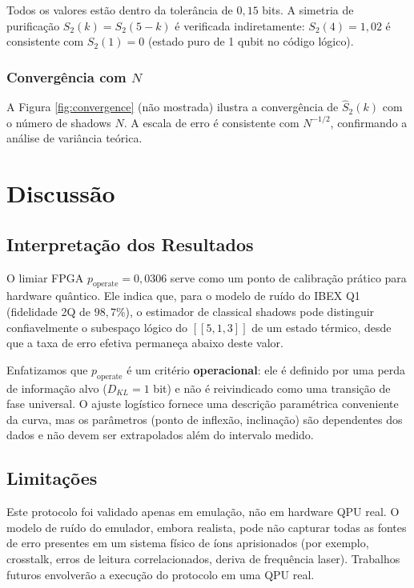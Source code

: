 \documentclass[12pt,a4paper,oneside]{book}
\theoremstyle{definition}
\theoremstyle{remark}
\begin{document}
Todos os valores estão dentro da tolerância de $0{,}15$ bits. A simetria de purificação $S_2(k) = S_2(5-k)$ é verificada indiretamente: $S_2(4) = 1{,}02$ é consistente com $S_2(1) = 0$ (estado puro de 1 qubit no código lógico).

\subsection{Convergência com $N$}

A Figura \ref{fig:convergence} (não mostrada) ilustra a convergência de $\widehat{S}_2(k)$ com o número de shadows $N$. A escala de erro é consistente com $N^{-1/2}$, confirmando a análise de variância teórica.

\chapter{Discussão}\label{chap:discussao}

\section{Interpretação dos Resultados}

O limiar FPGA $p_{\text{operate}} = 0{,}0306$ serve como um ponto de calibração prático para hardware quântico. Ele indica que, para o modelo de ruído do IBEX Q1 (fidelidade 2Q de $98{,}7\%$), o estimador de classical shadows pode distinguir confiavelmente o subespaço lógico do $[[5,1,3]]$ de um estado térmico, desde que a taxa de erro efetiva permaneça abaixo deste valor.

Enfatizamos que $p_{\text{operate}}$ é um critério \textbf{operacional}: ele é definido por uma perda de informação alvo ($D_{KL} = 1$ bit) e não é reivindicado como uma transição de fase universal. O ajuste logístico fornece uma descrição paramétrica conveniente da curva, mas os parâmetros (ponto de inflexão, inclinação) são dependentes dos dados e não devem ser extrapolados além do intervalo medido.

\section{Limitações}

Este protocolo foi validado apenas em emulação, não em hardware QPU real. O modelo de ruído do emulador, embora realista, pode não capturar todas as fontes de erro presentes em um sistema físico de íons aprisionados (por exemplo, crosstalk, erros de leitura correlacionados, deriva de frequência laser). Trabalhos futuros envolverão a execução do protocolo em uma QPU real.
\end{document}
